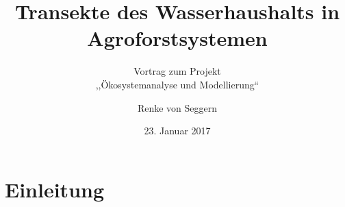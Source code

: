 \documentclass[xcolor=dvipsnames]{beamer}
\begin{document}
\title{Transekte des Wasserhaushalts in Agroforstsystemen}
\subtitle{Vortrag zum Projekt \\ ,,Ökosystemanalyse und Modellierung``}
\author{Renke von Seggern}
\date[23.01.2017]{23. Januar 2017}

\beamertemplatenavigationsymbolsempty

\begin{frame}[plain]
\titlepage
\end{frame}



\addtocounter{framenumber}{-1} %

\section{Einleitung}
\end{document}
